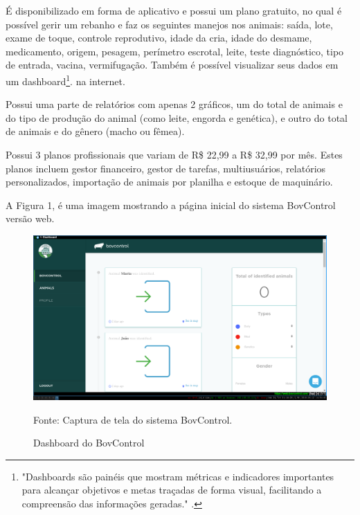 É disponibilizado em forma de aplicativo e possui um plano gratuito, no qual é possível gerir um rebanho e faz os seguintes manejos nos animais: saída, lote, exame de toque, controle reprodutivo, idade da cria, idade do desmame, medicamento, origem, pesagem, perímetro escrotal, leite, teste diagnóstico, tipo de entrada, vacina, vermifugação. Também é possível visualizar seus dados em um dashboard\footnote{"Dashboards são painéis que mostram métricas e indicadores importantes para alcançar objetivos e metas traçadas de forma visual, facilitando a compreensão das informações geradas." \cite{nascimento17}.}. na internet.

Possui uma parte de relatórios com apenas 2 gráficos, um do total de animais e do tipo de produção do animal (como leite, engorda e genética), e outro do total de animais e do gênero (macho ou fêmea).

Possui 3 planos profissionais que variam de R\$ 22,99 a R\$ 32,99 por mês. Estes planos incluem gestor financeiro, gestor de tarefas, multiusuários, relatórios personalizados, importação de animais por planilha e estoque de maquinário.

A Figura 1, é uma imagem mostrando a página inicial do sistema BovControl versão web.

\begin{figure}[H]
	\begin{center}
		\caption{Dashboard do BovControl}
		\includegraphics[width=\textwidth]{../img/bovcontrol.png}

		Fonte: Captura de tela do sistema BovControl.
	\end{center}
\end{figure}




